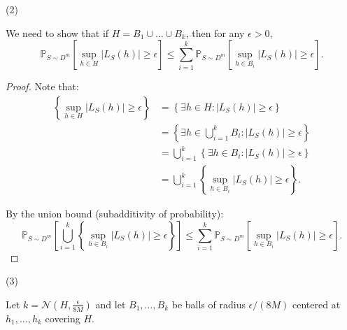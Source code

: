 \documentclass[letterpaper, 11pt]{article}
\newcommand{\1}{\mathds{1}}	%
\theoremstyle{definition}
\begin{document}
(2)

We need to show that if $H = B_1 \cup \ldots \cup B_k$, then for any $\epsilon > 0$,
\[
\mathbb{P}_{S \sim D^m}\left[\sup_{h \in H} |L_S(h)| \geq \epsilon\right] \leq \sum_{i=1}^k \mathbb{P}_{S \sim D^m}\left[\sup_{h \in B_i} |L_S(h)| \geq \epsilon\right].
\]

\begin{proof}
Note that:
\begin{align*}
\left\{\sup_{h \in H} |L_S(h)| \geq \epsilon\right\} &= \left\{\exists h \in H : |L_S(h)| \geq \epsilon\right\}\\
&= \left\{\exists h \in \bigcup_{i=1}^k B_i : |L_S(h)| \geq \epsilon\right\}\\
&= \bigcup_{i=1}^k \left\{\exists h \in B_i : |L_S(h)| \geq \epsilon\right\}\\
&= \bigcup_{i=1}^k \left\{\sup_{h \in B_i} |L_S(h)| \geq \epsilon\right\}.
\end{align*}

By the union bound (subadditivity of probability):
\[
\mathbb{P}_{S \sim D^m}\left[\bigcup_{i=1}^k \left\{\sup_{h \in B_i} |L_S(h)| \geq \epsilon\right\}\right] \leq \sum_{i=1}^k \mathbb{P}_{S \sim D^m}\left[\sup_{h \in B_i} |L_S(h)| \geq \epsilon\right].
\]
\end{proof}

(3)

Let $k = \mathcal{N}(H, \frac{\epsilon}{8M})$ and let $B_1, \ldots, B_k$ be balls of radius $\epsilon/(8M)$ centered at $h_1, \ldots, h_k$ covering $H$.
\end{document}
